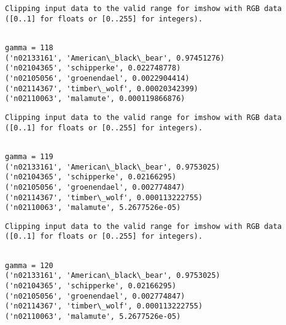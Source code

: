 \documentclass[11pt]{article}
\begin{document}
    \begin{Verbatim}[commandchars=\\\{\}]
Clipping input data to the valid range for imshow with RGB data ([0..1] for floats or [0..255] for integers).

    \end{Verbatim}

    \begin{Verbatim}[commandchars=\\\{\}]

gamma = 118
('n02133161', 'American\_black\_bear', 0.97451276)
('n02104365', 'schipperke', 0.022748778)
('n02105056', 'groenendael', 0.0022904414)
('n02114367', 'timber\_wolf', 0.00020342399)
('n02110063', 'malamute', 0.000119866876)

    \end{Verbatim}

    \begin{Verbatim}[commandchars=\\\{\}]
Clipping input data to the valid range for imshow with RGB data ([0..1] for floats or [0..255] for integers).

    \end{Verbatim}

    \begin{Verbatim}[commandchars=\\\{\}]

gamma = 119
('n02133161', 'American\_black\_bear', 0.9753025)
('n02104365', 'schipperke', 0.02166295)
('n02105056', 'groenendael', 0.002774847)
('n02114367', 'timber\_wolf', 0.000113222755)
('n02110063', 'malamute', 5.2677526e-05)

    \end{Verbatim}

    \begin{Verbatim}[commandchars=\\\{\}]
Clipping input data to the valid range for imshow with RGB data ([0..1] for floats or [0..255] for integers).

    \end{Verbatim}

    \begin{Verbatim}[commandchars=\\\{\}]

gamma = 120
('n02133161', 'American\_black\_bear', 0.9753025)
('n02104365', 'schipperke', 0.02166295)
('n02105056', 'groenendael', 0.002774847)
('n02114367', 'timber\_wolf', 0.000113222755)
('n02110063', 'malamute', 5.2677526e-05)

    \end{Verbatim}
\end{document}
